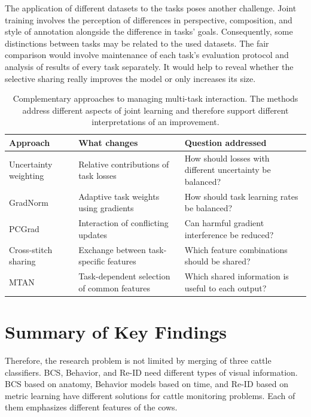 The application of different datasets to the tasks poses another challenge. Joint training involves the perception of differences in perspective, composition, and style of annotation alongside the difference in tasks' goals. Consequently, some distinctions between tasks may be related to the used datasets. The fair comparison would involve maintenance of each task's evaluation protocol and analysis of results of every task separately. It would help to reveal whether the selective sharing really improves the model or only increases its size.

\begin{table}[tbp]
\centering
\caption[Approaches to managing multi-task interaction]{Complementary approaches to managing multi-task interaction. The methods address different aspects of joint learning and therefore support different interpretations of an improvement.}
\label{tab:ch2_sharing_methods}
\small
\begin{tabularx}{\textwidth}{@{}>{\raggedright\arraybackslash}p{3.0cm}YY@{}}
\toprule
\textbf{Approach} & \textbf{What changes} & \textbf{Question addressed}\\
\midrule
Uncertainty weighting~\cite{kendall2018multi} & Relative contributions of task losses & How should losses with different uncertainty be balanced?\\
\addlinespace
GradNorm~\cite{chen2018gradnorm} & Adaptive task weights using gradients & How should task learning rates be balanced?\\
\addlinespace
PCGrad~\cite{yu2020pcgrad} & Interaction of conflicting updates & Can harmful gradient interference be reduced?\\
\addlinespace
Cross-stitch sharing~\cite{misra2016crossstitch} & Exchange between task-specific features & Which feature combinations should be shared?\\
\addlinespace
MTAN~\cite{liu2019mtan} & Task-dependent selection of common features & Which shared information is useful to each output?\\
\bottomrule
\end{tabularx}
\end{table}

\section{Summary of Key Findings}

Therefore, the research problem is not limited by merging of three cattle classifiers. BCS, Behavior, and Re-ID need different types of visual information. BCS based on anatomy, Behavior models based on time, and Re-ID based on metric learning have different solutions for cattle monitoring problems. Each of them emphasizes different features of the cows.

